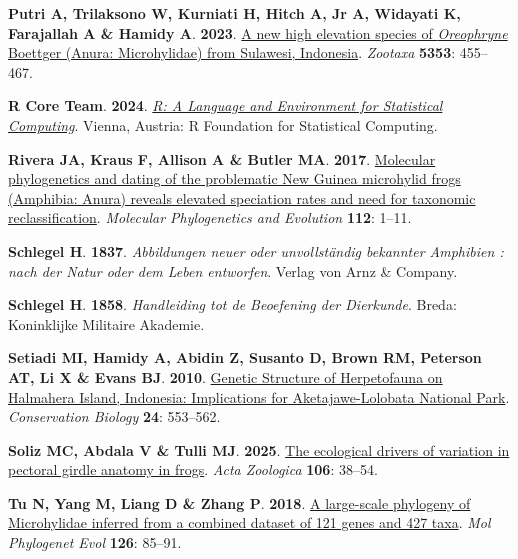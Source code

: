 \documentclass[
  letterpaper,
  DIV=11,
  numbers=noendperiod]{scrartcl}
\newlength{\cslhangindent}
\newenvironment{CSLReferences}[2] %
 {\begin{list}{}{%
  \setlength{\itemindent}{0pt}
  \setlength{\leftmargin}{0pt}
  \setlength{\parsep}{0pt}
  \ifodd #1
   \setlength{\leftmargin}{\cslhangindent}
   \setlength{\itemindent}{-1\cslhangindent}
  \fi
  \setlength{\itemsep}{#2\baselineskip}}}
 {\end{list}}
\begin{document}
\begin{CSLReferences}{0}{1}
\textbf{\textbf{Putri A}, \textbf{Trilaksono W}, \textbf{Kurniati H},
\textbf{Hitch A}, \textbf{Jr A}, \textbf{Widayati K}, \textbf{Farajallah
A} \& \textbf{Hamidy A}}. \textbf{2023}.
\href{https://doi.org/10.11646/zootaxa.5353.5.4}{{A new high elevation
species of \emph{Oreophryne} Boettger (Anura: Microhylidae) from
Sulawesi, Indonesia}}. \emph{Zootaxa} \textbf{5353}: 455--467.

\textbf{\textbf{R Core Team}}. \textbf{2024}.
\emph{\href{https://www.R-project.org/}{{R: A Language and Environment
for Statistical Computing}}}. Vienna, Austria: R Foundation for
Statistical Computing.

\textbf{\textbf{Rivera JA}, \textbf{Kraus F}, \textbf{Allison A} \&
\textbf{Butler MA}}. \textbf{2017}.
\href{https://doi.org/10.1016/j.ympev.2017.04.008}{{Molecular
phylogenetics and dating of the problematic New Guinea microhylid frogs
(Amphibia: Anura) reveals elevated speciation rates and need for
taxonomic reclassification}}. \emph{Molecular Phylogenetics and
Evolution} \textbf{112}: 1--11.

\textbf{\textbf{Schlegel H}}. \textbf{1837}. \emph{{Abbildungen neuer
oder unvollst{ä}ndig bekannter Amphibien : nach der Natur oder dem Leben
entworfen}}. Verlag von Arnz \& Company.

\textbf{\textbf{Schlegel H}}. \textbf{1858}. \emph{{Handleiding tot de
Beoefening der Dierkunde}}. Breda: Koninklijke Militaire Akademie.

\textbf{\textbf{Setiadi MI}, \textbf{Hamidy A}, \textbf{Abidin Z},
\textbf{Susanto D}, \textbf{Brown RM}, \textbf{Peterson AT}, \textbf{Li
X} \& \textbf{Evans BJ}}. \textbf{2010}.
\href{https://doi.org/10.1111/j.1523-1739.2009.01384.x}{{Genetic
Structure of Herpetofauna on Halmahera Island, Indonesia: Implications
for Aketajawe-Lolobata National Park}}. \emph{Conservation Biology}
\textbf{24}: 553--562.

\textbf{\textbf{Soliz MC}, \textbf{Abdala V} \& \textbf{Tulli MJ}}.
\textbf{2025}. \href{https://doi.org/10.1111/azo.12494}{{The ecological
drivers of variation in pectoral girdle anatomy in frogs}}. \emph{Acta
Zoologica} \textbf{106}: 38--54.

\textbf{\textbf{Tu N}, \textbf{Yang M}, \textbf{Liang D} \&
\textbf{Zhang P}}. \textbf{2018}.
\href{https://doi.org/10.1016/j.ympev.2018.03.036}{{A large-scale
phylogeny of Microhylidae inferred from a combined dataset of 121 genes
and 427 taxa}}. \emph{Mol Phylogenet Evol} \textbf{126}: 85--91.


\end{CSLReferences}
\end{document}
